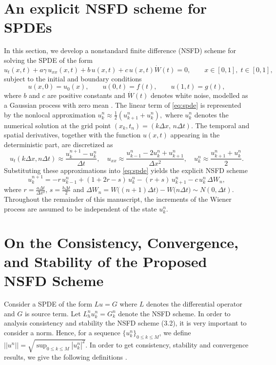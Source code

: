 \documentclass[twoside]{article}
\begin{document}
\section{An explicit NSFD scheme for SPDEs}
In this section, we develop a nonstandard finite difference (NSFD) scheme
for solving the SPDE of the form
\begin{equation}\label{eq:spde}
	u_t(x,t)+a\gamma\, u_{xx}(x,t)+b\,u(x,t)+c\,u(x,t)\dot{W}(t)=0,
	\qquad x\in[0,1],\; t\in[0,1],
\end{equation}
subject to the initial and boundary conditions
\[
u(x,0)=u_0(x),\qquad u(0,t)=f(t),\qquad u(1,t)=g(t),
\]
where $b$ and $c$ are positive constants and $\dot{W}(t)$ denotes
white noise, modelled as a Gaussian process with zero mean \cite{Kloeden:Platen:1995}. The linear term of \eqref{eq:spde} is represented by the
nonlocal approximation
$u_k^n\approx\frac12\!\left(u_{k+1}^n+u_k^n\right),$ where $u_k^n$ denotes the
numerical solution at the grid point
$(x_k,t_n)=(k\Delta x,\,n\Delta t)$. The temporal and spatial derivatives,
together with the function $u(x,t)$ appearing in the deterministic part,
are discretized as
\[
u_t(k\Delta x,n\Delta t)\approx\frac{u_k^{n+1}-u_k^n}{\Delta t},\quad
u_{xx}\approx\frac{u_{k-1}^n-2u_k^n+u_{k+1}^n}{\Delta x^2},\quad
u_k^n\approx\frac{u_{k+1}^n+u_k^n}{2}.
\]
Substituting these approximations into \eqref{eq:spde} yields the explicit
NSFD scheme
\begin{equation}\label{eq:nsfd}
	u_k^{n+1}=-r\,u_{k-1}^n+(1+2r-s)\,u_k^n-(r+s)\,u_{k+1}^n-c\,u_k^n\,\Delta W_n,
\end{equation}
where $r=\frac{a\Delta t}{\Delta x^2}$, $s=\frac{b\Delta t}{2}$ and
$\Delta W_n=W\big((n+1)\Delta t\big)-W\big(n\Delta t\big)\sim N(0,\Delta t)$.
Throughout the remainder of this manuscript, the increments of the Wiener
process are assumed to be independent of the state $u_k^n$.

\section{On the Consistency, Convergence, and Stability of the Proposed NSFD Scheme}
Consider a SPDE of the form $Lu = G$ where $L$ denotes the differential operator and $G$ is source term. Let $L_h^n u_k^n = G_k^n$ denote the NSFD scheme. In order to analysis consistency and stability the NSFD scheme (3.2), it is very important to consider a norm. Hence, for a sequence $\{u_k^n\}_{0 \le k \le M}$, we define $||u^n|| = \sqrt{\sup_{0 \le k \le M} |u_k^n|^2}$. In order to get consistency, stability and convergence results, we give the following definitions \cite{Roth:2002}.
\end{document}
